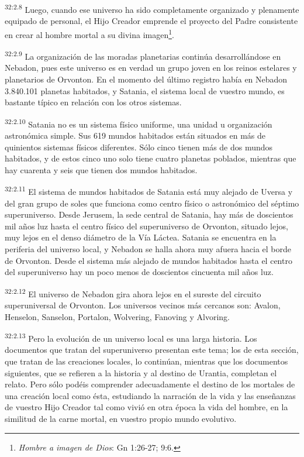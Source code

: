 \par
\textsuperscript{32:2.8} Luego, cuando ese universo ha sido completamente organizado y plenamente equipado de personal, el Hijo Creador emprende el proyecto del Padre consistente en crear al hombre mortal a su divina imagen\footnote{\textit{Hombre a imagen de Dios}: Gn 1:26-27; 9:6.}.

\par
\textsuperscript{32:2.9} La organización de las moradas planetarias continúa desarrollándose en Nebadon, pues este universo es en verdad un grupo joven en los reinos estelares y planetarios de Orvonton. En el momento del último registro había en Nebadon 3.840.101 planetas habitados, y Satania, el sistema local de vuestro mundo, es bastante típico en relación con los otros sistemas.

\par
\textsuperscript{32:2.10} Satania no es un sistema físico uniforme, una unidad u organización astronómica simple. Sus 619 mundos habitados están situados en más de quinientos sistemas físicos diferentes. Sólo cinco tienen más de dos mundos habitados, y de estos cinco uno solo tiene cuatro planetas poblados, mientras que hay cuarenta y seis que tienen dos mundos habitados.

\par
\textsuperscript{32:2.11} El sistema de mundos habitados de Satania está muy alejado de Uversa y del gran grupo de soles que funciona como centro físico o astronómico del séptimo superuniverso. Desde Jerusem, la sede central de Satania, hay más de doscientos mil años luz hasta el centro físico del superuniverso de Orvonton, situado lejos, muy lejos en el denso diámetro de la Vía Láctea. Satania se encuentra en la periferia del universo local, y Nebadon se halla ahora muy afuera hacia el borde de Orvonton. Desde el sistema más alejado de mundos habitados hasta el centro del superuniverso hay un poco menos de doscientos cincuenta mil años luz.

\par
\textsuperscript{32:2.12} El universo de Nebadon gira ahora lejos en el sureste del circuito superuniversal de Orvonton. Los universos vecinos más cercanos son: Avalon, Henselon, Sanselon, Portalon, Wolvering, Fanoving y Alvoring.

\par
\textsuperscript{32:2.13} Pero la evolución de un universo local es una larga historia. Los documentos que tratan del superuniverso presentan este tema; los de esta sección, que tratan de las creaciones locales, lo continúan, mientras que los documentos siguientes, que se refieren a la historia y al destino de Urantia, completan el relato. Pero sólo podéis comprender adecuadamente el destino de los mortales de una creación local como ésta, estudiando la narración de la vida y las enseñanzas de vuestro Hijo Creador tal como vivió en otra época la vida del hombre, en la similitud de la carne mortal, en vuestro propio mundo evolutivo.

